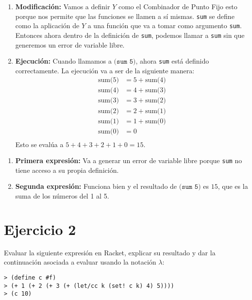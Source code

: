 \documentclass{article}
\begin{document}
\begin{enumerate}
    \item \textbf{Modificación:}
    Vamos a definir \( Y \) como el Combinador de Punto Fijo esto porque nos permite que las funciones se llamen a sí mismas.
    \texttt{sum} se define como la aplicación de \( Y \) a una función que va a tomar como argumento \texttt{sum}. Entonces ahora dentro de la definición de \texttt{sum}, podemos llamar a \texttt{sum} sin que generemos un error de variable libre.

    \item \textbf{Ejecución:}
    Cuando llamamos a \( \texttt{(sum 5)} \), ahora \texttt{sum} está definido correctamente.
    La ejecución va a ser de la siguiente manera:
    \begin{align*}
        \text{sum(5)} & = 5 + \text{sum(4)} \\
        \text{sum(4)} & = 4 + \text{sum(3)} \\
        \text{sum(3)} & = 3 + \text{sum(2)} \\
        \text{sum(2)} & = 2 + \text{sum(1)} \\
        \text{sum(1)} & = 1 + \text{sum(0)} \\
        \text{sum(0)} & = 0 \\
    \end{align*}
    Esto se evalúa a \( 5 + 4 + 3 + 2 + 1 + 0 = 15 \).
\end{enumerate}

\begin{enumerate}
    \item \textbf{Primera expresión:} Va a generar un error de variable libre porque \texttt{sum} no tiene acceso a su propia definición.
    \item \textbf{Segunda expresión:} Funciona bien y el resultado de \( \texttt{(sum 5)} \) es \( 15 \), que es la suma de los números del 1 al 5.
\end{enumerate}

\section{Ejercicio 2}

Evaluar la siguiente expresión en Racket, explicar su resultado y dar la continuación asociada a evaluar usando la notación $\lambda$:

\begin{verbatim}
> (define c #f)
> (+ 1 (+ 2 (+ 3 (+ (let/cc k (set! c k) 4) 5))))
> (c 10)
\end{verbatim}
\end{document}
